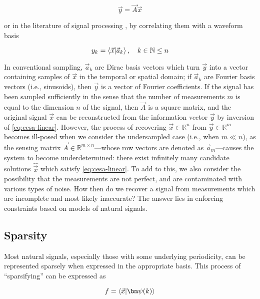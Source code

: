 \begin{equation}\label{eq:cesa-linear}
	\vec{y} = \vec{A} \vec{x}
\end{equation}

\noindent or in the literature of signal processing \cite{Candes2008b}, by correlating them with a waveform basis

\begin{equation}\label{eq:cesa-correlation}
	y_k = \innerproduct{\vec{x}}{\vec{a}_k} , \quad k \in \mathbb{N} \leq n
\end{equation}

\noindent In conventional sampling, $\vec{a}_k$ are Dirac basis vectors which turn $\vec{y}$ into a vector containing samples of $\vec{x}$ in the temporal or spatial domain; if $\vec{a}_k$ are Fourier basis vectors (i.e., sinusoids), then $\vec{y}$ is a vector of Fourier coefficients. If the signal has been sampled sufficiently in the sense that the number of measurements $m$ is equal to the dimension $n$ of the signal, then $\vec{A}$ is a square matrix, and the original signal $\vec{x}$ can be reconstructed from the information vector $\vec{y}$ by inversion of \eqref{eq:cesa-linear}. However, the process of recovering $\vec{x} \in \mathbb{R}^n$ from $\vec{y} \in \mathbb{R}^m$ becomes ill-posed when we consider the undersampled case (i.e., when $m \ll n$), as the sensing matrix $\vec{A} \in \mathbb{R}^{m \times n}$---whose row vectors are denoted as $\vec{a}_m$---causes the system to become underdetermined: there exist infinitely many candidate solutions $\hat{\vec{x}}$ which satisfy \eqref{eq:cesa-linear}. To add to this, we also consider the possibility that the measurements are not perfect, and are contaminated with various types of noise. How then do we recover a signal from measurements which are incomplete and most likely inaccurate? The answer lies in enforcing constraints based on models of natural signals.

\subsection{Sparsity}

Most natural signals, especially those with some underlying periodicity, can be represented sparsely when expressed in the appropriate basis. This process of ``sparsifying'' can be expressed as

\begin{equation}\label{eq:sparsify}
	f = \innerproduct{\vec{x}}{\bm\psi(k)}
\end{equation}

